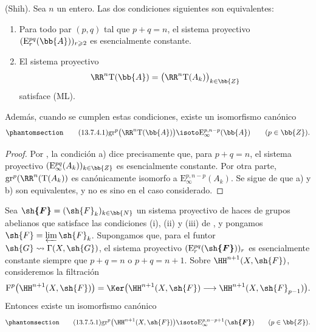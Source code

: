 \documentclass[oneside]{amsart}
\renewcommand{\geq}{\geqslant}
\let\EGAOriginalLabel\label
\renewcommand{\label}[1]{\phantomsection\EGAOriginalLabel{#1}}
\begin{document}
\begin{proposition}[13.7.4]
\label{0.13.7.4}
(Shih).
Sea $n$ un entero.
Las dos condiciones siguientes son equivalentes:
\begin{enumerate}
  \item[{\rm a)}] Para todo par $(p,q)$ tal que $p+q=n$, el
  sistema proyectivo
  $(\mathrm{E}_r^{pq}(\bb{A}))_{r\geq2}$ es esencialmente constante.
  \item[{\rm b)}] El sistema proyectivo
  \[
    \RR^n\mathrm{T}(\bb{A})
    =
    \bigl(\RR^n\mathrm{T}(A_k)\bigr)_{k\in\bb{Z}}
  \]
  satisface {\rm(ML)}.
\end{enumerate}
Además, cuando se cumplen estas condiciones, existe un
isomorfismo canónico
\begin{equation}
\label{0.13.7.4.1}
\tag{13.7.4.1}
  \mathrm{gr}^p\bigl(\RR^n\mathrm{T}(\bb{A})\bigr)
  \isoto
  \mathrm{E}_\infty^{p,n-p}(\bb{A})
  \qquad(p\in\bb{Z}).
\end{equation}
\end{proposition}

\begin{proof}
Por , la condición {\rm a)} dice precisamente que, para
$p+q=n$, el sistema proyectivo
$(\mathrm{E}_\infty^{pq}(A_k))_{k\in\bb{Z}}$ es esencialmente
constante.
Por otra parte,
$\mathrm{gr}^p(\RR^n(\mathrm{T}(A_k))$ es canónicamente isomorfo a
$\mathrm{E}_\infty^{p,n-p}(A_k)$.
Se sigue de  que {\rm a)} y {\rm b)} son
equivalentes, y  no es sino
 en el caso considerado.
\end{proof}

\begin{corollary}[13.7.5]
\label{0.13.7.5}
Sea $\boldsymbol{\sh{F}}=(\sh{F}_k)_{k\in\bb{N}}$ un sistema proyectivo de
haces de grupos abelianos que satisface las condiciones {\rm(i)}, {\rm(ii)}
y {\rm(iii)} de , y pongamos
$\sh{F}=\varprojlim\sh{F}_k$.
Supongamos que, para el funtor
$\sh{G}\leadsto\Gamma(X,\sh{G})$, el sistema proyectivo
$(\mathrm{E}_r^{pq}(\boldsymbol{\sh{F}}))_r$ es esencialmente constante siempre que
$p+q=n$ o $p+q=n+1$.
Sobre $\HH^{n+1}(X,\sh{F})$, consideremos la filtración
\[
  \mathrm{F}^p\bigl(\HH^{n+1}(X,\sh{F})\bigr)
  =
  \Ker\bigl(
    \HH^{n+1}(X,\sh{F})
    \longrightarrow
    \HH^{n+1}(X,\sh{F}_{p-1})
  \bigr).
\]
Entonces existe un isomorfismo canónico
\begin{equation}
\label{0.13.7.5.1}
\tag{13.7.5.1}
  \mathrm{gr}^p\bigl(\HH^{n+1}(X,\sh{F})\bigr)
  \isoto
  \mathrm{E}_\infty^{p,n-p+1}(\boldsymbol{\sh{F}})
  \qquad(p\in\bb{Z}).
\end{equation}
\end{corollary}
\end{document}
